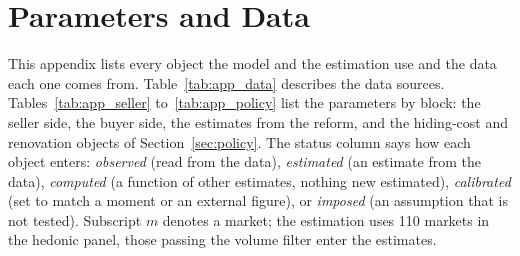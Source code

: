 \section{Parameters and Data}
\label{app:parameters}

This appendix lists every object the model and the estimation use and the data each one comes from. Table~\ref{tab:app_data} describes the data sources. Tables~\ref{tab:app_seller} to~\ref{tab:app_policy} list the parameters by block: the seller side, the buyer side, the estimates from the reform, and the hiding-cost and renovation objects of Section~\ref{sec:policy}. The status column says how each object enters: \emph{observed} (read from the data), \emph{estimated} (an estimate from the data), \emph{computed} (a function of other estimates, nothing new estimated), \emph{calibrated} (set to match a moment or an external figure), or \emph{imposed} (an assumption that is not tested). Subscript $m$ denotes a market; the estimation uses 110 markets in the hedonic panel, those passing the volume filter enter the estimates.

